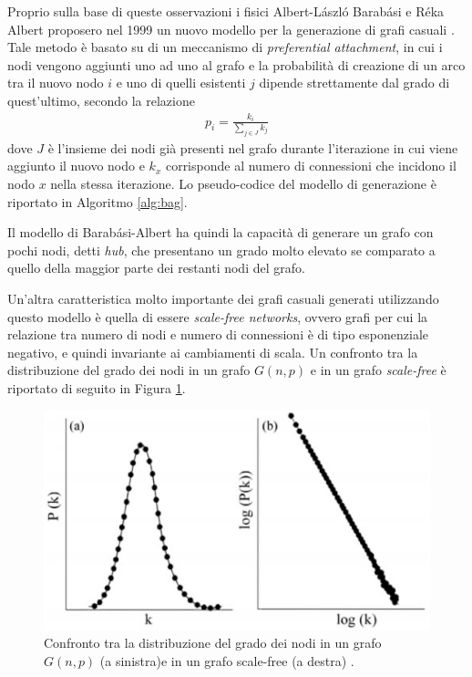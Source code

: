 Proprio sulla base di queste osservazioni i fisici Albert-László Barabási e Réka Albert proposero nel 1999 un nuovo modello per la generazione di grafi casuali \cite{Barab_si_1999}. Tale metodo è basato su di un meccanismo di \textit{preferential attachment}, in cui i nodi vengono aggiunti uno ad uno al grafo e la probabilità di creazione di un arco tra il nuovo nodo $i$ e uno di quelli esistenti $j$ dipende strettamente dal grado di quest'ultimo, secondo la relazione
\begin{align*}
p_i = \frac{k_i}{\sum_{j \in J}k_j}
\end{align*}
dove $J$ è l'insieme dei nodi già presenti nel grafo durante l'iterazione in cui viene aggiunto il nuovo nodo e $k_x$ corrisponde al numero di connessioni che incidono il nodo $x$ nella stessa iterazione. Lo pseudo-codice del modello di generazione è riportato in Algoritmo \ref{alg:bag}.

Il modello di Barabási-Albert ha quindi la capacità di generare un grafo con pochi nodi, detti \textit{hub}, che presentano un grado molto elevato se comparato a quello della maggior parte dei restanti nodi del grafo. 

Un'altra caratteristica molto importante dei grafi casuali generati utilizzando questo modello è quella di essere \textit{scale-free networks}, ovvero grafi per cui la relazione tra numero di nodi e numero di connessioni è di tipo esponenziale negativo, e quindi invariante ai cambiamenti di scala. 
Un confronto tra la distribuzione del grado dei nodi in un grafo $G(n,p)$ e in un grafo \textit{scale-free} è riportato di seguito in Figura \ref{fig:bagdist}. 

\begin{figure}[h!]
     \centering
       \includegraphics[scale=0.45]{images/bagdist.eps}
       \caption{Confronto tra la distribuzione del grado dei nodi in un grafo $G(n,p)$ (a sinistra)e in un grafo scale-free (a destra) \cite{costa}.}
        \label{fig:bagdist}
\end{figure}

